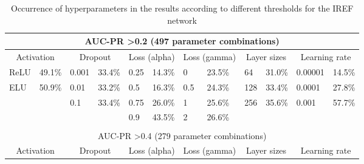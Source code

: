 \documentclass[ppgc, diss, english]{iiufrgs}
\begin{document}
\begin{table}[!th]
\caption{Occurrence of hyperparameters in the results according to different thresholds for the IREF network \label{tab:occurrence_hyperparameters_iref}}
\centering
 \begin{adjustbox}{scale=0.9,center}
 
\begin{tabular}{llllllllllll}
\hline
\multicolumn{12}{c}{AUC-PR \textgreater 0.2 (497 parameter combinations)}                                                                                                                                \\ \hline
\multicolumn{2}{c}{Activation} & \multicolumn{2}{c}{Dropout} & \multicolumn{2}{c}{Loss (alpha)} & \multicolumn{2}{c}{Loss (gamma)} & \multicolumn{2}{c}{Layer sizes} & \multicolumn{2}{c}{Learning rate} \\
ReLU          & 49.1\%         & 0.001        & 33.4\%       & 0.25           & 14.3\%          & 0             & 23.5\%           & 64            & 31.0\%          & 0.00001          & 14.5\%         \\
ELU           & 50.9\%         & 0.01         & 33.2\%       & 0.5            & 16.3\%          & 0.5           & 24.3\%           & 128           & 33.4\%          & 0.0001           & 27.8\%         \\
              &                & 0.1          & 33.4\%       & 0.75           & 26.0\%          & 1             & 25.6\%           & 256           & 35.6\%          & 0.001            & 57.7\%         \\
              &                &              &              & 0.9            & 43.5\%          & 2             & 26.6\%           &               &                 &                  &                \\
              &                &              &              &                &                 &               &                  &               &                 &                  &                \\ \hline
\multicolumn{12}{c}{AUC-PR \textgreater 0.4 (279 parameter combinations)}                                                                                                                                \\ \hline
\multicolumn{2}{c}{Activation} & \multicolumn{2}{c}{Dropout} & \multicolumn{2}{c}{Loss (alpha)} & \multicolumn{2}{c}{Loss (gamma)} & \multicolumn{2}{c}{Layer sizes} & \multicolumn{2}{c}{Learning rate} \\

\end{tabular}
\end{adjustbox}
\end{table}
\end{document}
